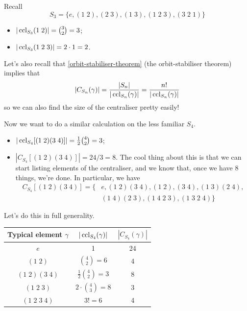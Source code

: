 \documentclass{../template/note}
\begin{document}
    \begin{example}[\(n=3\)]
        Recall
        \[
            S_3 = \{e, (1\; 2), (2 \; 3), (1 \; 3), (1 \; 2 \; 3), (3 \; 2 \; 1)\}
        \]
        \begin{itemize}
            \item \(|\operatorname{ccl}_{S_3}(1 \; 2)| = \binom{3}{2} = 3\);
            \item \(|\operatorname{ccl}_{S_3}(1 \; 2 \; 3)| = 2 \cdot 1 = 2\).
        \end{itemize}
    \end{example}
    Let's also recall that \cref{orbit-stabiliser-theorem} (the orbit-stabiliser theorem) implies that
    \begin{align*}
        |C_{S_n}(\gamma)| = \frac{|S_n|}{|\operatorname{ccl}_{S_n}(\gamma)|} = \frac{n!}{|\operatorname{ccl}_{S_n}(\gamma)|}
    \end{align*}
    so we can also find the size of the centraliser pretty easily!

    \begin{example}[\(n=4\)]
        Now we want to do a similar calculation on the less familiar \(S_4\).
        \begin{itemize}
            \item \(|\operatorname{ccl}_{S_4}[(1 \; 2)(3 \; 4)]| = \frac{1}{2} \binom{4}{2} = 3\);
            \item \(|C_{S_4}[(1 \; 2)(3 \; 4)]| = 24/3 = 8\). The cool thing about this is that we can start listing elements of the centraliser, and we know that, once we have 8 things, we're done. In particular, we have
            \begin{align*}
                C_{S_4}[(1 \; 2)(3 \; 4)] = \{&e, (1 \; 2)(3 \; 4), (1 \; 2), (3 \; 4), (1 \; 3)(2 \; 4), \\ &(1 \; 4)(2 \; 3), (1 \; 4 \; 2 \; 3), (1 \; 3 \; 2 \; 4)\}
            \end{align*}
        \end{itemize}
        Let's do this in full generality.
        \begin{center}
            \begin{tabular}{c | c | c}
                Typical element \(\gamma\) & \(|\operatorname{ccl}_{S_4}(\gamma)|\) & \(|C_{S_4}(\gamma)|\) \\
                \hline
                \(e\) & 1 & 24 \\
                \((1 \; 2)\) & \(\binom 4 2 = 6\) & 4 \\
                \((1 \; 2)(3 \; 4)\) & \(\frac 1 2 \binom 4 2 = 3\) & 8 \\
                \((1 \; 2 \; 3)\) & \(2 \cdot \binom 4 3 = 8\) & 3 \\
                \((1 \; 2 \; 3 \; 4)\) & \(3! = 6\) & 4
            \end{tabular}
        \end{center}
    \end{example}
    
\end{document}
